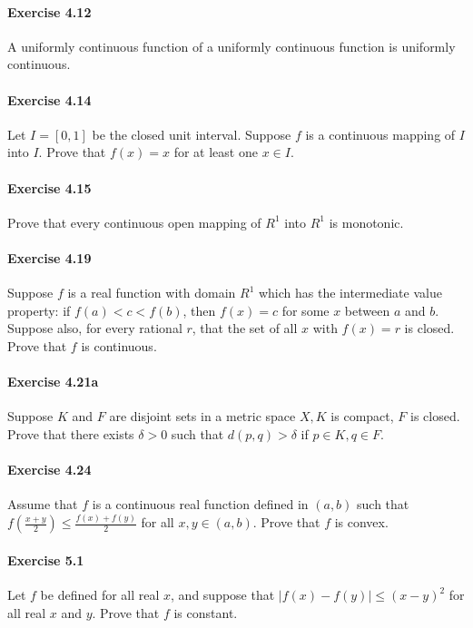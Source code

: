 \documentclass{article}
\theoremstyle{definition}
\begin{document}
\paragraph{Exercise 4.12} A uniformly continuous function of a uniformly continuous function is uniformly continuous.

\paragraph{Exercise 4.14} Let $I=[0,1]$ be the closed unit interval. Suppose $f$ is a continuous mapping of $I$ into $I$. Prove that $f(x)=x$ for at least one $x \in I$.

\paragraph{Exercise 4.15} Prove that every continuous open mapping of $R^{1}$ into $R^{1}$ is monotonic.

\paragraph{Exercise 4.19} Suppose $f$ is a real function with domain $R^{1}$ which has the intermediate value property: if $f(a)<c<f(b)$, then $f(x)=c$ for some $x$ between $a$ and $b$. Suppose also, for every rational $r$, that the set of all $x$ with $f(x)=r$ is closed. Prove that $f$ is continuous.

\paragraph{Exercise 4.21a} Suppose $K$ and $F$ are disjoint sets in a metric space $X, K$ is compact, $F$ is closed. Prove that there exists $\delta>0$ such that $d(p, q)>\delta$ if $p \in K, q \in F$.

\paragraph{Exercise 4.24} Assume that $f$ is a continuous real function defined in $(a, b)$ such that $f\left(\frac{x+y}{2}\right) \leq \frac{f(x)+f(y)}{2}$ for all $x, y \in(a, b)$. Prove that $f$ is convex.

\paragraph{Exercise 5.1} Let $f$ be defined for all real $x$, and suppose that $|f(x)-f(y)| \leq (x-y)^{2}$ for all real $x$ and $y$. Prove that $f$ is constant.
\end{document}
